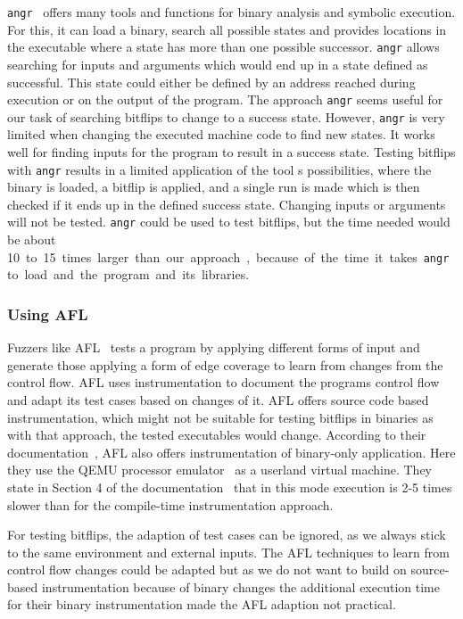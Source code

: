 \texttt{angr}~\cite{angrpaper} offers many tools and functions for binary
analysis and symbolic execution. For this, it can load a binary, search all
possible states and provides locations in the executable where a state has more
than one possible successor. \texttt{angr} allows searching for inputs and
arguments which would end up in a state defined as successful. This state could
either be defined by an address reached during execution or on the output of the
program. The approach \texttt{angr} seems useful for our task of searching
bitflips to change to a success state. However, \texttt{angr} is very limited
when changing the executed machine code to find new states. It works well for
finding inputs for the program to result in a success state. Testing bitflips
with \texttt{angr} results in a limited application of the tool\textquotesingle
s possibilities, where the binary is loaded, a bitflip is applied, and a single
run is made which is then checked if it ends up in the defined success state.
Changing inputs or arguments will not be tested. \texttt{angr} could be used to
test bitflips, but the time needed would be about \SI{10} to \SI{15} times
larger than our approach, because of the time it takes \texttt{angr} to load and
the program and its libraries.

\subsubsection{Using AFL}

Fuzzers like AFL~\cite{aflweb} tests a program by applying different forms of
input and generate those applying a form of edge coverage to learn from changes
from the control flow. AFL uses instrumentation to document the
program\textquotesingle s control flow and adapt its test cases based on changes
of it. AFL offers source code based instrumentation, which might not be suitable
for testing bitflips in binaries as with that approach, the tested executables
would change. According to their documentation~\cite{aflreadme}, AFL also offers
instrumentation of binary-only application. Here they use the QEMU processor
emulator~\cite{qemuweb} as a userland virtual machine. They state in Section 4
of the documentation~\cite{aflreadme} that in this mode execution is 2-5 times
slower than for the compile-time instrumentation approach.

For testing bitflips, the adaption of test cases can be ignored, as we always
stick to the same environment and external inputs. The AFL techniques to learn
from control flow changes could be adapted but as we do not want to build on
source-based instrumentation because of binary changes the additional execution
time for their binary instrumentation made the AFL adaption not practical.

